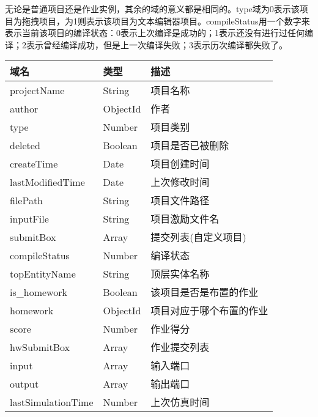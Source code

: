 无论是普通项目还是作业实例，其余的域的意义都是相同的。type域为0表示该项目为拖拽项目，为1则表示该项目为文本编辑器项目。compileStatus用一个数字来表示当前该项目的编译状态：0表示上次编译是成功的；1表示还没有进行过任何编译；2表示曾经编译成功，但是上一次编译失败；3表示历次编译都失败了。
\begin{center}
	\begin{longtable}{p{}p{}p{}}
		\toprule
		 域名 & 类型 & 描述 \\
		 \midrule
		 projectName & String & 项目名称 \\
		 author & ObjectId & 作者 \\
		 type & Number & 项目类别 \\
		 deleted & Boolean & 项目是否已被删除 \\
		 createTime & Date & 项目创建时间 \\
		 lastModifiedTime & Date & 上次修改时间 \\
		 filePath & String & 项目文件路径 \\
		 inputFile & String & 项目激励文件名 \\
		 submitBox & Array & 提交列表(自定义项目) \\ 
		 compileStatus & Number & 编译状态 \\ 
		 topEntityName & String & 顶层实体名称 \\
		 is\_homework & Boolean & 该项目是否是布置的作业 \\
		 homework & ObjectId & 项目对应于哪个布置的作业 \\
		 score & Number & 作业得分 \\
		 hwSubmitBox & Array & 作业提交列表 \\ 
		 input & Array & 输入端口 \\ 
		 output & Array & 输出端口 \\
 		 lastSimulationTime & Number & 上次仿真时间 \\
		 \bottomrule
	\end{longtable}
\end{center}


